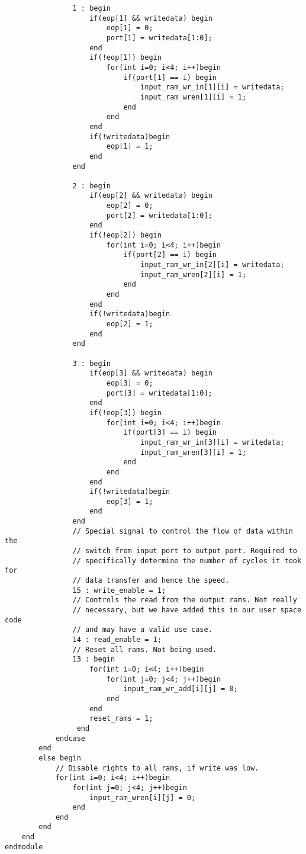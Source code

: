 \documentclass[twoside,12pt,fleqn]{book} %
\begin{document}
\begin{lstlisting}
				1 : begin
                    if(eop[1] && writedata) begin
                        eop[1] = 0;
                        port[1] = writedata[1:0];
                    end
                    if(!eop[1]) begin
                        for(int i=0; i<4; i++)begin
                            if(port[1] == i) begin
                                input_ram_wr_in[1][i] = writedata;
                                input_ram_wren[1][i] = 1;
                            end
                        end
                    end
                    if(!writedata)begin
                        eop[1] = 1;
                    end
				end
			
				2 : begin
                    if(eop[2] && writedata) begin
                        eop[2] = 0;
                        port[2] = writedata[1:0];
                    end
                    if(!eop[2]) begin
                        for(int i=0; i<4; i++)begin
                            if(port[2] == i) begin
                                input_ram_wr_in[2][i] = writedata;
                                input_ram_wren[2][i] = 1;
                            end
                        end
                    end
                    if(!writedata)begin
                        eop[2] = 1;
                    end
				end
				
				3 : begin
                    if(eop[3] && writedata) begin
                        eop[3] = 0;
                        port[3] = writedata[1:0];
                    end
                    if(!eop[3]) begin
                        for(int i=0; i<4; i++)begin
                            if(port[3] == i) begin
                                input_ram_wr_in[3][i] = writedata;
                                input_ram_wren[3][i] = 1;
                            end
                        end
                    end
                    if(!writedata)begin
                        eop[3] = 1;
                    end
				end
				// Special signal to control the flow of data within the
				// switch from input port to output port. Required to
				// specifically determine the number of cycles it took for
				// data transfer and hence the speed.
                15 : write_enable = 1;
                // Controls the read from the output rams. Not really
                // necessary, but we have added this in our user space code
                // and may have a valid use case.
				14 : read_enable = 1;
				// Reset all rams. Not being used.
				13 : begin 
                    for(int i=0; i<4; i++)begin
                        for(int j=0; j<4; j++)begin
                            input_ram_wr_add[i][j] = 0;
                        end
                    end
					reset_rams = 1;
				 end
			endcase
		end
		else begin
		    // Disable rights to all rams, if write was low.
            for(int i=0; i<4; i++)begin
                for(int j=0; j<4; j++)begin
                    input_ram_wren[i][j] = 0;
                end
            end
        end
	end
endmodule
\end{lstlisting}
\end{document}
